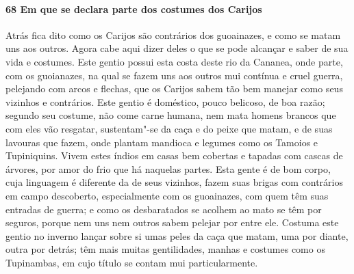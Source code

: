 \begin{linenumbers}
\paragraph{68 Em que se declara parte dos costumes dos Carijos} \quad
Atrás fica dito como os Carijos são contrários dos guoainazes, e como se matam uns aos
outros. Agora cabe aqui dizer deles o que se pode alcançar e saber de sua vida e costumes.
Este gentio possui esta costa deste rio da Cananea, onde parte, com os guoianazes, na qual
se fazem uns aos outros mui contínua e cruel guerra, pelejando com arcos e flechas, que os
Carijos sabem tão bem manejar como seus vizinhos e contrários. Este gentio é doméstico,
pouco belicoso, de boa razão; segundo seu costume, não come carne humana, nem mata homens
brancos que com eles vão resgatar, sustentam"-se da caça e do peixe que matam, e de suas
lavouras que fazem, onde plantam mandioca e legumes como os Tamoios e Tupiniquins. Vivem
estes índios em casas bem cobertas e tapadas com cascas de árvores, por amor do frio que
há naquelas partes. Esta gente é de bom corpo, cuja linguagem é diferente da de seus
vizinhos, fazem suas brigas com contrários em campo descoberto, especialmente com os
guoainazes, com quem têm suas entradas de guerra; e como os desbaratados se acolhem ao
mato se têm por seguros, porque nem uns nem outros sabem pelejar por entre ele. Costuma
este gentio no inverno lançar sobre si umas peles da caça que matam, uma por diante, outra
por detrás; têm mais muitas gentilidades, manhas e costumes como os Tupinambas, em cujo
título se contam mui particularmente.


\end{linenumbers}
